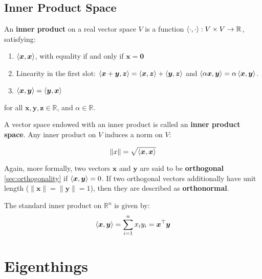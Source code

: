 \documentclass{article}
\begin{document}
\subsection{Inner Product Space}

\begin{definition}
    An \textbf{inner product} on a real vector space $V$ is a function $\braket{\cdot, \cdot}: V \times V \rightarrow \mathbb{R}$, satisfying: 

    \begin{enumerate}
        \item $\braket{\bm{x}, \bm{x}}$, with equality if and only if $\bm{x} = \bm{0}$
        \item Linearity in the first slot: $\braket{\bm{x} + \bm{y}, \bm{z}} = \braket{\bm{x}, \bm{z}} + \braket{\bm{y}, \bm{z}}$ and $\braket{\alpha\bm{x}, \bm{y}} = \alpha\braket{\bm{x}, \bm{y}}$. 
        \item $\braket{\bm{x}, \bm{y}} = \braket{\bm{y}, \bm{x}}$
    \end{enumerate}
    \noindent for all $\bm{x, y, z} \in \mathbb{R}$, and $\alpha \in \mathbb{R}$.
\end{definition}

\noindent A vector space endowed with an inner product is called an \textbf{inner product space}. Any inner product on $V$ induces a norm on $V$:

\begin{equation*}
    \lVert x \rVert = \sqrt{\braket{\bm{x}, \bm{x}}}
\end{equation*}

\noindent Again, more formally, two vectors $\bm{x}$ and $\bm{y}$ are said to be \textbf{orthogonal} \ref{sec:orthogonality} if $\braket{\bm{x}, \bm{y}} = 0$. If two orthogonal vectors additionally have unit length ($\lVert \bm{x} \rVert = \lVert \bm{y} \rVert = 1$), then they are described as \textbf{orthonormal}. 

\begin{definition}
    The standard inner product on $\mathbb{R}^n$ is given by:
    \begin{equation*}
        \braket{\bm{x}, \bm{y}} = \sum_{i=1}^{n} x_i y_i = \bm{x}^\top \bm{y}
    \end{equation*}
\end{definition}

\section{Eigenthings}


\newpage


% 
% 

\end{document}

